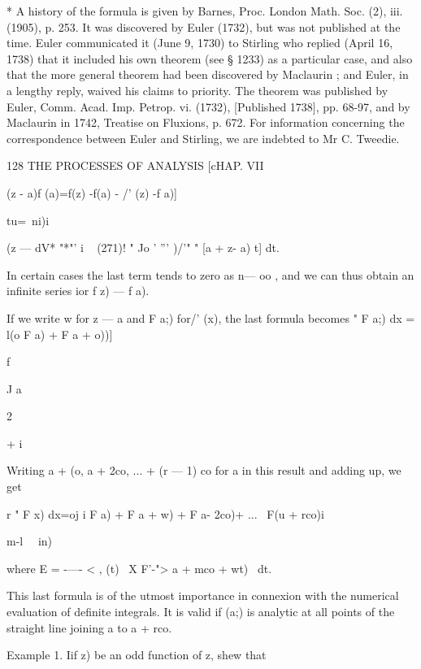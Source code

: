 * A history of the formula is given by Barnes, Proc. London Math. Soc. (2), iii. (1905), p. 253. 
It was discovered by Euler (1732), but was not published at the time. Euler communicated 
it (June 9, 1730) to Stirling who replied (April 16, 1738) that it included his own theorem (see 
§ 1233) as a particular case, and also that the more general theorem had been discovered by 
Maclaurin ; and Euler, in a lengthy reply, waived his claims to priority. The theorem was 
published by Euler, Comm. Acad. Imp. Petrop. vi. (1732), [Published 1738], pp. 68-97, and by 
Maclaurin in 1742, Treatise on Fluxions, p. 672. For information concerning the correspondence 
between Euler and Stirling, we are indebted to Mr C. Tweedie. 



128 THE PROCESSES OF ANALYSIS [cHAP. VII 



(z - a)f (a)=f(z) -f(a) -    /' (z) -f  a)] 

tu=\   ni)i 

(z — dV* "*"' i  
~ (271)! " Jo ' '''  )/'" " [a +  z- a) t] dt. 

In certain cases the last term tends to zero as n—  oo , and we can thus 
obtain an infinite series ior f  z) — f  a). 

If we write w for z — a and F a;) for/' (x), the last formula becomes 
" F a;) dx = l(o  F a) + F a + o))] 



f 

J a 



2 

+ i 









Writing a + (o, a + 2co, ...   + (r — 1) co for a in this result and adding up, 
we get 

r "  F x) dx=oj i  F a) + F a + w) + F a- 2co)+ ... \ F(u + rco)i 

m-l \ \  in)\ 

where E  = -—- < , (t) \ X F'-">  a + mco + wt) \ dt. 

This last formula is of the utmost importance in connexion with the 
numerical evaluation of definite integrals. It is valid if  (a;) is analytic at 
all points of the straight line joining a to a + rco. 

Example 1. Iif z) be an odd function of z, shew that 


